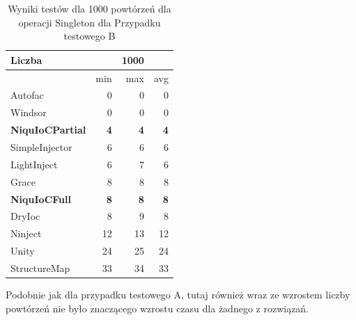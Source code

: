 \documentclass[12pt]{article}
\begin{document}
\begin{table}[H]
\captionsetup{belowskip=0pt,aboveskip=0pt}
\begin{center}
\begin{small}
	\begin{tabular}{ | l | r r r | }
    		\hline
Liczba & & 1000 & \\ \hline
 & min & max & avg \\ \hline
Autofac & 0 & 0 & 0 \\ \hline
Windsor & 0 & 0 & 0 \\ \hline
\textbf{NiquIoCPartial} & \textbf{4} & \textbf{4} & \textbf{4} \\ \hline
SimpleInjector & 6 & 6 & 6 \\ \hline
LightInject & 6 & 7 & 6 \\ \hline
Grace & 8 & 8 & 8 \\ \hline
\textbf{NiquIoCFull} & \textbf{8} & \textbf{8} & \textbf{8} \\ \hline
DryIoc & 8 & 9 & 8 \\ \hline
Ninject & 12 & 13 & 12 \\ \hline
Unity & 24 & 25 & 24 \\ \hline
StructureMap & 33 & 34 & 33 \\ \hline
  	\end{tabular}
\end{small}
\end{center}
\caption{Wyniki testów dla 1000 powtórzeń dla operacji Singleton dla Przypadku testowego B}
\label{TestCaseB_Singleton1000}
\end{table}
Podobnie jak dla przypadku testowego A, tutaj również wraz ze wzrostem liczby powtórzeń nie było znaczącego wzrostu czasu dla żadnego z rozwiązań.
\end{document}
